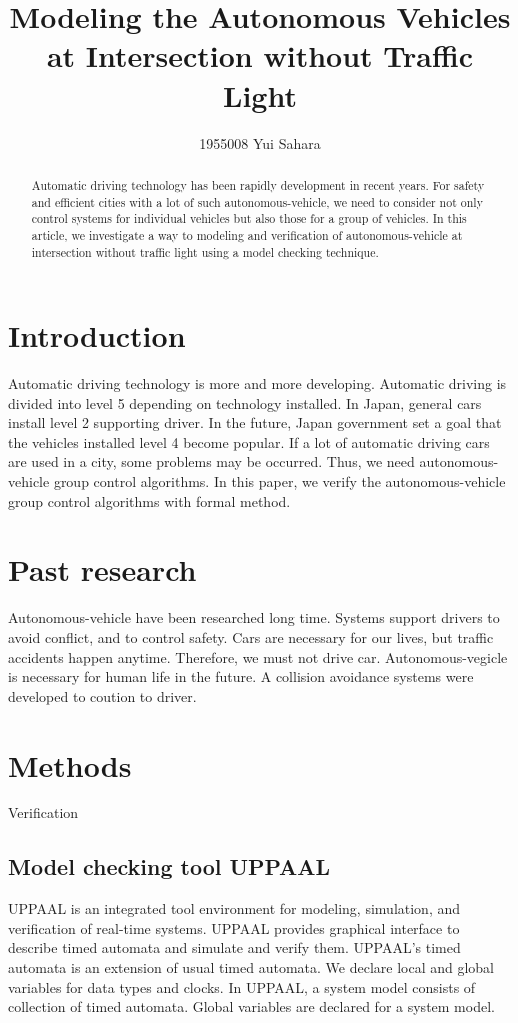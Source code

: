 \documentclass[]{article}
\title{Modeling the Autonomous Vehicles at Intersection without Traffic Light}
\author{1955008	Yui Sahara}
\date{}
\begin{document}
\maketitle
\begin{abstract}
	Automatic driving technology has been rapidly development in recent years.  For safety and efficient cities with a lot of such autonomous-vehicle, we need to consider not only control systems for individual vehicles but also those for a group of vehicles.  In this article, we investigate a way to modeling and verification of autonomous-vehicle at intersection without traffic light using a model checking technique.
\end{abstract}

\section{Introduction}
	  Automatic driving technology is more and more developing.  Automatic driving is divided into level  5 depending on technology installed.  In Japan, general cars install level 2 supporting driver.  In the future,  Japan government set a goal that the vehicles installed level 4 become popular.  If a lot of automatic driving cars are used in a city, some problems may be occurred.  Thus, we need autonomous-vehicle group control algorithms.  In this paper, we verify the autonomous-vehicle group control algorithms with formal method.
\section{Past research}
	Autonomous-vehicle have been researched long time.  Systems support drivers to avoid conflict, and to control safety.  Cars are necessary for our lives, but traffic accidents happen anytime.  Therefore, we must not drive car.  Autonomous-vegicle is necessary for human life in the future.  A collision avoidance systems were developed to coution to driver.   
\section{Methods}
Verification 
	\subsection{Model checking tool UPPAAL}
		UPPAAL is an integrated tool environment for modeling, simulation, and verification of real-time systems.  UPPAAL provides graphical interface to describe timed automata and simulate and verify them. UPPAAL's timed automata is an extension of usual timed automata.  We declare local and global variables for data types and clocks. In UPPAAL, a system model consists of collection of timed automata.  Global variables are declared for a system model.  
\end{document}
